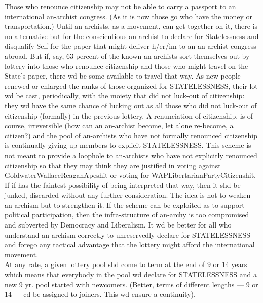 \documentclass[12pt, onecolumn, letterpaper, oneside]{book}
\begin{document}
Those who renounce citizenship may not be able to carry a passport to an international an-archist congress. (As it is now those go who have the money or transportation.) Until an-archists, as a movement, can get together on it, there is no alternative but for the conscientious an-archist to declare for Statelessness and disqualify Self for the paper that might deliver h/er/im to an an-archist congress abroad. But if, say, 63 percent of the known an-archists sort themselves out by lottery into those who renounce citizenship and those who might travel on the State's paper, there wd be some available to travel that way. As new people renewed or enlarged the ranks of those organized for STATELESSNESS, their lot wd be cast, periodically, with the moiety that did not luck-out of citizenship: they wd have the same chance of lucking out as all those who did not luck-out of citizenship (formally) in the previous lottery. A renunciation of citizenship, is of course, irreversible (how can an an-archist become, let alone re-become, a citizen?) and the pool of an-archists who have not formally renounced citizenship is continually giving up members to explicit STATELESSNESS. This scheme is not meant to provide a loophole to an-archists who have not explicitly renounced citizenship so that they may think they are justified in voting against GoldwaterWallaceReaganApeshit or voting for WAPLibertarianPartyCitizenshit. If if has the faintest possibility of being interpreted that way, then it shd be junked, discarded without any further consideration. The idea is not to weaken an-archism but to strengthen it. If the scheme can be exploited as to support political participation, then the infra-structure of an-archy is too compromised and subverted by Democracy and Liberalism. It wd be better for all who understand an-archism correctly to unreservedly declare for STATELESSNESS and forego any tactical advantage that the lottery might afford the international movement.\\
At any rate, a given lottery pool shd come to term at the end of 9 or 14 years which means that everybody in the pool wd declare for STATELESSNESS and a new 9 yr. pool started with newcomers. (Better, terms of different lengths --- 9 or 14 --- cd be assigned to joiners. This wd ensure a continuity).\\
\end{document}
